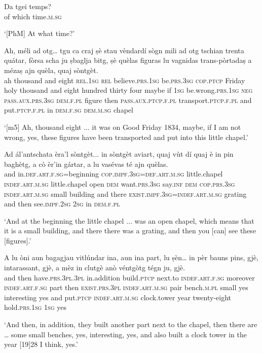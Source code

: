 \begin{linenumbers}
\gll [PhM] Da tgei temps?  \\
\textsc{} of which time.\textsc{m.sg}   \\
\end{linenumbers}
\medskip 
\glt `[PhM] At what time?'
\medskip

\begin{linenumbers}
\gll  [m5] Ah, méli ad otg… tgu ca craj ṣè stau vèndardí sògn mili ad otg tschian trenta quátar, fòrsa scha ju ṣbaglja bitg, ṣè quèlas figuras lu vagnidas trans-pòrtadaṣ a mézaṣ ajn quèla, quaj sòntgèt.  \\
\textsc{} ah thousand and eight \textsc{rel.1sg} \textsc{rel} believe.\textsc{prs.1sg} be.\textsc{prs.3sg} \textsc{cop.ptcp} Friday holy thousand and eight hundred thirty four maybe if \textsc{1sg} be.wrong.\textsc{prs.1sg} \textsc{neg} \textsc{pass.aux.prs.3sg} \textsc{dem.f.pl} figure then \textsc{pass.aux.ptcp.f.pl} transport.\textsc{ptcp.f.pl} and put.\textsc{ptcp.f.pl} in \textsc{dem.f.sg} \textsc{dem.m.sg} chapel  \\
\end{linenumbers}
\medskip
\glt `[m5] Ah, thousand eight ... it was on Good Friday 1834, maybe,  if I am not wrong, yes, these figures have been transported and put into this little chapel.'
\medskip

\begin{linenumbers}
\gll Ad ál’antschata èra’l sòntgèt... in sòntgèt aviart, quaj vùt dí quaj è in pin baghètg, a cò èr’in gártar, a lu vasévas té ajn quèlas.   \\
and in.\textsc{def.art.f.sg=}beginning \textsc{cop.impf.3sg=def.art.m.sg} little.chapel \textsc{indef.art.m.sg} little.chapel open \textsc{dem} want.\textsc{prs.3sg} say.\textsc{inf}  \textsc{dem} \textsc{cop.prs.3sg} \textsc{indef.art.m.sg} small building and there \textsc{exist.impf.3sg=indef.art.m.sg} grating  and then  see.\textsc{impf.2sg} \textsc{2sg} in \textsc{dem.f.pl}  \\
\end{linenumbers}
\medskip
\glt `And at the beginning the little chapel ... was an open chapel, which means that it is a small building, and there there was a grating, and then you [can] see these [figures].'
\medskip

\begin{linenumbers}
\gll  A lu òni aun bagagjau vitlúndar ina, aun ina part, lu ṣèn… in pèr bauns pins, gjè, intarassant, gjè, a mèz in clutgè anò véntgòtg tégn ju, gjè.  \\
and then  have.\textsc{prs.3pl}.\textsc{3pl} in.addition build.\textsc{ptcp} next.to \textsc{indef.art.f.sg} moreover \textsc{indef.art.f.sg} part then  \textsc{exist.prs.3pl} \textsc{indef.art.m.sg} pair bench.\textsc{m.pl} small yes interesting yes and put.\textsc{ptcp} \textsc{indef.art.m.sg} clock.tower year twenty-eight hold.\textsc{prs.1sg} \textsc{1sg} yes \\
\end{linenumbers} 
\medskip
\glt `And then, in addition, they built another part next to the chapel, then there are … some small benches, yes, interesting, yes, and also built a clock tower in the year [19]28 I think, yes.'
\medskip

